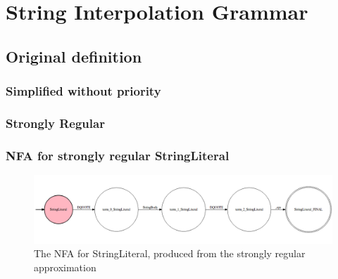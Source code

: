 
\chapter{String Interpolation Grammar} %

\label{app:stringInterp} %

\section{Original definition} \label{app:stringInterp:default}


\subsection{Simplified without priority} \label{app:stringInterp:simple}


\pagebreak
\subsection{Strongly Regular} \label{app:stringInterp:stronglyregular}


\subsection{NFA for strongly regular StringLiteral}
\begin{figure}[h!]
	\centering
	\includegraphics[width=\textwidth, keepaspectratio]{Figures/String_nfa_stringliteral.png}
	\decoRule
 	\caption[NFA for StringLiteral]{The NFA for StringLiteral, produced from the strongly regular approximation}
 	\label{fig:stringInterp:NFA:StringLiteral}
\end{figure}


